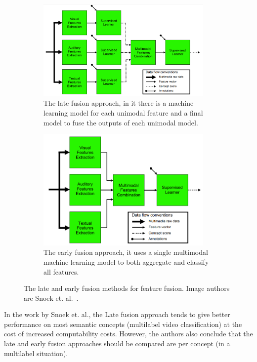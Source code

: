 \begin{figure}[!ht]
    \centering
    \begin{subfigure}[b]{0.55\textwidth}
        \includegraphics[width=0.94\textwidth]{img/late-fusion.png}
        \caption{The late fusion approach, in it there is a machine learning model for each unimodal feature and a final model to fuse the outputs of each unimodal model.}
        \label{fig:early-fusion}
    \end{subfigure}
    \begin{subfigure}[b]{0.44\textwidth}
        \includegraphics[width=0.94\textwidth]{img/early-fusion.png}
        \caption{The early fusion approach, it uses a single multimodal machine learning model to both aggregate and classify all features.}
        \label{fig:late-fusion}
    \end{subfigure}
    \caption{The late and early fusion methods for feature fusion. Image authors are Snoek et. al.~\cite{snoek2005featurefusion}.}
\end{figure}


In the work by Snoek et. al.\cite{snoek2005featurefusion}, the Late fusion approach tends to give better performance on most semantic concepts (multilabel video classification) at the cost of increased computability costs. However, the authors also conclude that the late and early fusion approaches should be compared are per concept (in a multilabel situation).%